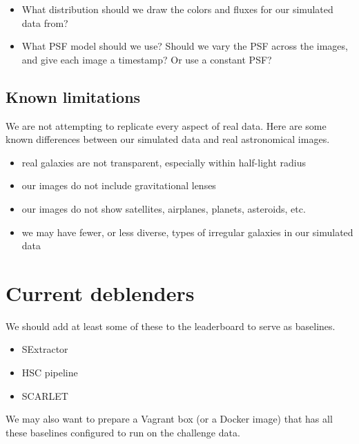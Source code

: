 \documentclass[10pt,letter]{article}
\newcommand{\jr}[1]{{\color{blue}[JR] #1}}
\begin{document}
\begin{itemize}
\jr{3. Even for the Netflix prize (\$1 million prize) they banned using ``external'' information for predicting movie ratings, so a ban like this wouldn't be unprecedented. The winners had to submit their code to collect the prize so it was easily verified.}\\
\jr{4. If you can generate unlimited labeled data, you can just train a deep neural network to produce the right label for the data. You wouldn't even need to use the supplied training set, which wouldn't have labels, to train your algorithm. So somehow we have to keep users from generated their own labeled datasets---I think that means keeping the simulator secret or off limits}
\item What distribution should we draw the colors and fluxes for our simulated data from?
\item What PSF model should we use? Should we vary the PSF across the images, and give each image a timestamp? Or use a constant PSF?
\end{itemize}


\subsection{Known limitations}
We are not attempting to replicate every aspect of real data. Here are some known differences between our simulated data and real astronomical images.
\begin{itemize}
\item real galaxies are not transparent, especially within half-light radius
\item our images do not include gravitational lenses
\item our images do not show satellites, airplanes, planets, asteroids, etc.
\item we may have fewer, or less diverse, types of irregular galaxies in our simulated data
\end{itemize}


\section{Current deblenders}
We should add at least some of these to the leaderboard to serve as baselines.

\begin{itemize}
    \item SExtractor~\cite{bertin1996sextractor}
    \item HSC pipeline~\cite{bosch2018hyper}
    \item SCARLET~\cite{melchior2018scarlet}
\end{itemize}

We may also want to prepare a Vagrant box (or a Docker image) that has all these baselines configured to run on the challenge data.

{}

\end{document}
